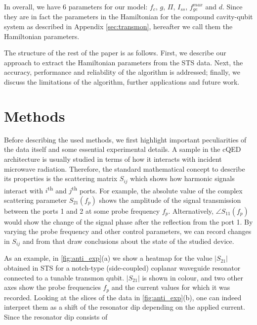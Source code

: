 \documentclass[%
 aip,
 draft,
 amsmath,amssymb,
 reprint,%
]{revtex4-1}
\begin{document}
In overall, we have 6 parameters for our model: $f_c$, $g$, $\Pi$, $I_{ss}$, $f_{ge}^{max}$ and $d$. Since they are in fact the parameters in the Hamiltonian for the compound cavity-qubit system as described in Appendix \ref{sec:transmon}, hereafter we call them the Hamiltonian parameters.

The structure of the rest of the paper is as follows. First, we describe our approach to extract the Hamiltonian parameters from the STS data. Next, the accuracy, performance and reliability of the algorithm is addressed; finally, we discuss the limitations of the algorithm, further applications and future work. 



\section{Methods}

Before describing the used methods, we first highlight important peculiarities of the data itself and some essential experimental details. A sample in the cQED architecture is usually studied in terms of how it interacts with incident microwave radiation. Therefore, the standard mathematical concept to describe its properties is the scattering matrix $S_{ij}$ which shows how harmonic signals interact with  $i$\textsuperscript{th} and $j$\textsuperscript{th} ports. For example, the absolute value of the complex scattering parameter $S_{21}(f_p)$ shows the amplitude of the signal transmission between the ports 1 and 2 at some probe frequency $f_p$. Alternatively, $\angle S_{11}(f_p)$ would show the change of the signal phase after the reflection from the port 1. By varying the probe frequency and other control parameters, we can record changes in $S_{ij}$ and from that draw conclusions about the state of the studied device.

As an example, in \autoref{fig:anti_exp}(a) we show a heatmap for the value $|S_{21}|$ obtained in STS for a notch-type (side-coupled) coplanar waveguide resonator connected to a tunable transmon qubit. $|S_{21}|$ is shown in colour, and two other axes show the probe frequencies $f_p$ and the current values for which it was recorded. Looking at the slices of the data in \autoref{fig:anti_exp}(b), one can indeed interpret them as a shift of the resonator dip depending on the applied current. Since the resonator dip consists of 
\end{document}
